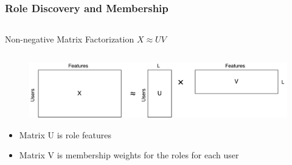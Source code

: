 \begin{frame}
\frametitle{Role Discovery and Membership}

\begin{columns}
	\begin{column}{0.5\textwidth}
		\begin{block}{\small Non-negative Matrix Factorization}
			$X \approx UV$
		\end{block}
	\end{column}
	\begin{column}{0.5\textwidth}
	\end{column}
\end{columns}
\begin{figure}
\includegraphics[scale=.3]{graphics/nmf}
\end{figure}

\begin{itemize}
\item Matrix U is role features 
\item Matrix V is membership weights for the roles for each user
\end{itemize}
\end{frame}

